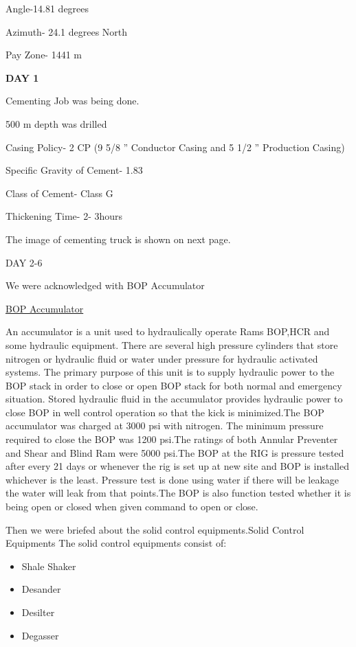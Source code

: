 \documentclass[11pt,a4paper]{article}
\begin{document}
Angle-14.81 degrees

Azimuth- 24.1 degrees North

Pay Zone- 1441 m

\textbf{DAY \hfill 1}

Cementing Job was being done.

500 m depth was drilled

Casing Policy- 2 CP (9 5/8 ” Conductor Casing and 5 1/2 ” Production Casing)

Specific Gravity of Cement- 1.83

Class of Cement- Class G

Thickening Time- 2- 3hours

The image of cementing truck is shown on next page.

DAY 2-6

We were acknowledged with BOP Accumulator


\underline{BOP Accumulator}

An accumulator is a unit used to hydraulically operate Rams BOP,HCR and some hydraulic equipment. There are several high pressure cylinders that store nitrogen or hydraulic fluid or water under pressure for hydraulic activated systems. The primary purpose of this unit is to supply hydraulic power to the BOP stack in order to close or open BOP stack for both normal and emergency situation. Stored hydraulic fluid in the accumulator provides hydraulic power to close BOP in well control operation so that the kick is minimized.The BOP accumulator was charged at 3000 psi with nitrogen. The minimum pressure required to close the BOP was 1200 psi.The ratings of both Annular Preventer and Shear and Blind Ram were 5000 psi.The BOP at the RIG is pressure tested after every 21 days or whenever the rig is set up at new site and BOP is installed whichever is the least. Pressure test is done using water if there will be leakage the water will leak from that points.The BOP is also function tested whether it is being open or closed when given command to open or close.


\noindent Then we were briefed about the solid control equipments.Solid Control Equipments The solid control equipments consist of:

\begin{itemize}

\item Shale Shaker
\item Desander
\item Desilter
\item Degasser

\end{itemize}

 
\end{document}
